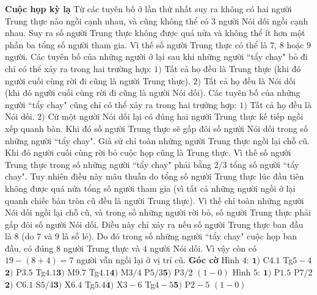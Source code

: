 \begin{multicols}{2}
	\textbf{\color{gocco}Cuộc họp kỳ lạ}
	\vskip 0.1cm
	Từ các tuyên bố ở lần thứ nhất suy ra không có hai người Trung thực nào ngồi cạnh nhau, và cũng không thể có $3$  người Nói dối ngồi cạnh nhau. Suy ra số người Trung thực không được quá nửa và không thể ít hơn một phần ba tổng số người tham gia. Vì thế số người Trung thực có thể là  $7$, $8$ hoặc $9$  người.
	\vskip 0.1cm
	Các tuyên bố của những người ở lại sau khi những người ``tẩy chay" bỏ đi chỉ có thể xảy ra trong hai trường hợp:
	\vskip 0.1cm
	$1)$	Tất cả họ đều là Trung thực (khi đó người cuối cùng rời đi cũng là người Trung thực).
	\vskip 0.1cm
	$2)$	Tất cả họ đều là Nói dối (khi đó người cuối cùng rời đi cũng là người Nói dối).
	\vskip 0.1cm
	Các tuyên bố của những người ``tẩy chay" cũng chỉ có thể xảy ra trong hai trường hợp:
	\vskip 0.1cm
	$1)$	Tất cả họ đều là Nói dối.
	\vskip 0.1cm
	$2)$	Cứ một người Nói dối lại có đúng  hai người Trung thực kế tiếp ngồi xếp quanh bàn. Khi đó số người Trung thực sẽ gấp đôi số người Nói dối trong số những người ``tẩy chay".
	\vskip 0.1cm
	Giả sử  chỉ toàn những người Trung thực ngồi lại chỗ cũ. Khi đó người cuối cùng rời bỏ cuộc họp cũng là Trung thực. Vì thế số người Trung thực trong số những người ``tẩy chay" phải bằng $2/3$  tổng số người ``tẩy chay". Tuy nhiên điều này mâu thuẫn do tổng số người Trung thực lúc đầu tiên không được quá nửa tổng số người tham gia (vì tất cả những người ngồi ở lại quanh chiếc bàn tròn cũ đều là người Trung thực).
	\vskip 0.1cm
	Vì thế chỉ toàn những người Nói dối ngồi lại chỗ cũ, và trong số những người rời bỏ, số người Trung thực phải gấp đôi số người Nói dối. Điều này chỉ xảy ra nếu số người Trung thực ban đầu là $8$  (do $7$  và $9$ là số lẻ). Do đó trong số những người ``tẩy chay" cuộc họp ban đầu, có đúng $8$ người Trung thực và $4$ người Nói dối. Vì vậy còn có $19-(8+4) = 7$  người vẫn ngồi lại ở vị trí cũ.
	\vskip 0.1cm
	\textbf{\color{gocco}Góc cờ}
	\vskip 0.1cm
	Hình $4$: $\pmb{1)}$	C$4.1$ Tg$5-4$\quad $\pmb{2)}$ P$3.5$ Tg$4.1$\quad $\pmb{3)}$ M$9.7$ Tg$4.1$\quad $\pmb{4)}$ M$3/4$ P$5/3$\quad $\pmb{5)}$ P$3/2$ $(1-0)$
	\vskip 0.1cm
	Hình $5$: $\pmb{1)}$	P$1.5$ P$7/2$\quad $\pmb{2)}$ C$6.1$ S$5/4$\quad $\pmb{3)}$ X$6.4$ Tg$5.4$\quad $\pmb{4)}$ X$3-6$ Tg$4-5$\quad $\pmb{5)}$ P$2-5$ $(1-0)$
\end{multicols}




